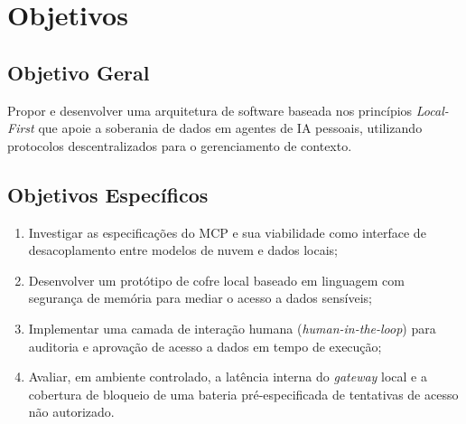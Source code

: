 \section{Objetivos}
\subsection{Objetivo Geral}
Propor e desenvolver uma arquitetura de software baseada nos princípios \textit{Local-First} que apoie a soberania de dados em agentes de IA pessoais, utilizando protocolos descentralizados para o gerenciamento de contexto.

\subsection{Objetivos Específicos}
\begin{enumerate}
\item Investigar as especificações do MCP e sua viabilidade como interface de desacoplamento entre modelos de nuvem e dados locais;
\item Desenvolver um protótipo de cofre local baseado em linguagem com segurança de memória para mediar o acesso a dados sensíveis;
\item Implementar uma camada de interação humana (\textit{human-in-the-loop}) para auditoria e aprovação de acesso a dados em tempo de execução;
\item Avaliar, em ambiente controlado, a latência interna do \textit{gateway} local e a cobertura de bloqueio de uma bateria pré-especificada de tentativas de acesso não autorizado.
\end{enumerate}


